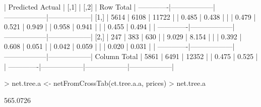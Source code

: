 \documentclass{article}
\begin{document}
\begin{Schunk}
\begin{Soutput}
 
             | Predicted 
      Actual |             [,1] |             [,2] |        Row Total | 
-------------|------------------|------------------|------------------|
        [1,] |             5614 |             6108 |            11722 | 
             |            0.485 |            0.438 |                  | 
             |            0.479 |            0.521 |            0.949 | 
             |            0.958 |            0.941 |                  | 
             |            0.455 |            0.494 |                  | 
-------------|------------------|------------------|------------------|
        [2,] |              247 |              383 |              630 | 
             |            9.029 |            8.154 |                  | 
             |            0.392 |            0.608 |            0.051 | 
             |            0.042 |            0.059 |                  | 
             |            0.020 |            0.031 |                  | 
-------------|------------------|------------------|------------------|
Column Total |             5861 |             6491 |            12352 | 
             |            0.475 |            0.525 |                  | 
-------------|------------------|------------------|------------------|
\end{Soutput}
\begin{Sinput}
> net.tree.a <- netFromCrossTab(ct.tree.a.a, prices)
> net.tree.a
\end{Sinput}
\begin{Soutput}
[1] 565.0726
\end{Soutput}
\end{Schunk}
\end{document}
